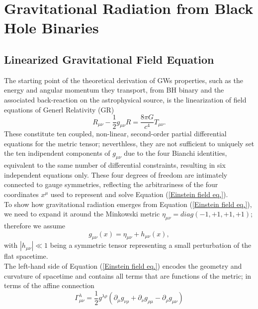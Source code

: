 \section{Gravitational Radiation from Black Hole Binaries}





\subsection{Linearized Gravitational Field Equation}

The starting point of the theoretical derivation of GWs properties, such as the energy and angular momentum they transport, from BH binary and the associated back-reaction on the astrophysical source, is the linearization of  field equations of Generl Relativity (GR)
\begin{equation}\label{Einstein field eq.}
    R_{\mu \nu}-\frac{1}{2}g_{\mu \nu} R=\frac{8\pi G}{c^4}T_{\mu \nu}.
\end{equation}
These constitute ten coupled, non-linear, second-order partial differential equations for the metric tensor; neverthless, they are not sufficient to uniquely set the ten indipendent components of $g_{\mu\nu}$ due to the four  Bianchi identities, equivalent to the same number of differential constraints, resulting in six  independent equations only. These four degrees of freedom are intimately connected to gauge symmetries, reflecting the arbitrariness of the four coordinates $x^\mu$ used to represent and solve Equation (\ref{Einstein field eq.}).\\To show how gravitational radiation emerges from Equation (\ref{Einstein field eq.}), we need to expand it around the Minkowski metric $\eta_{\mu \nu}=diag(-1,+1,+1,+1)$; therefore we assume
\begin{equation}
    g_{\mu \nu}(x)=\eta_{\mu \nu}+h_{\mu \nu}(x),
\end{equation}
with $|h_{\mu \nu}|\ll1$ being a symmetric tensor representing a small perturbation of the flat spacetime.\\The left-hand side of Equation (\ref{Einstein field eq.}) encodes the geometry and curvature of spacetime and contains all terms that are functions of the metric; in terms of the affine connection
\begin{equation}\label{affine connection def}
    \Gamma^\lambda _{\mu\nu}=\frac{1}{2}g^{\lambda \rho}(\partial_\mu g_{\nu\rho}+\partial_\nu g_{\rho\mu}-\partial_\rho g_{\mu\nu})
\end{equation}

